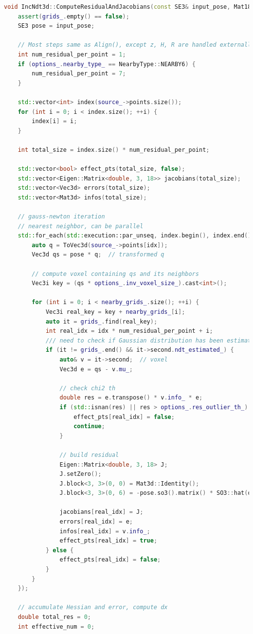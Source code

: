 \begin{lstlisting}[language=c++,caption=src/ch7/ndt\_inc.cc]
void IncNdt3d::ComputeResidualAndJacobians(const SE3& input_pose, Mat18d& HTVH, Vec18d& HTVr) {
	assert(grids_.empty() == false);
	SE3 pose = input_pose;
	
	// Most steps same as Align(), except z, H, R are handled externally
	int num_residual_per_point = 1;
	if (options_.nearby_type_ == NearbyType::NEARBY6) {
		num_residual_per_point = 7;
	}
	
	std::vector<int> index(source_->points.size());
	for (int i = 0; i < index.size(); ++i) {
		index[i] = i;
	}
	
	int total_size = index.size() * num_residual_per_point;
	
	std::vector<bool> effect_pts(total_size, false);
	std::vector<Eigen::Matrix<double, 3, 18>> jacobians(total_size);
	std::vector<Vec3d> errors(total_size);
	std::vector<Mat3d> infos(total_size);
	
	// gauss-newton iteration
	// nearest neighbor, can be parallel
	std::for_each(std::execution::par_unseq, index.begin(), index.end(), [&](int idx) {
		auto q = ToVec3d(source_->points[idx]);
		Vec3d qs = pose * q;  // transformed q
		
		// compute voxel containing qs and its neighbors
		Vec3i key = (qs * options_.inv_voxel_size_).cast<int>();
		
		for (int i = 0; i < nearby_grids_.size(); ++i) {
			Vec3i real_key = key + nearby_grids_[i];
			auto it = grids_.find(real_key);
			int real_idx = idx * num_residual_per_point + i;
			/// need to check if Gaussian distribution has been estimated
			if (it != grids_.end() && it->second.ndt_estimated_) {
				auto& v = it->second;  // voxel
				Vec3d e = qs - v.mu_;
				
				// check chi2 th
				double res = e.transpose() * v.info_ * e;
				if (std::isnan(res) || res > options_.res_outlier_th_) {
					effect_pts[real_idx] = false;
					continue;
				}
				
				// build residual
				Eigen::Matrix<double, 3, 18> J;
				J.setZero();
				J.block<3, 3>(0, 0) = Mat3d::Identity();                   // Jacobian w.r.t. p
				J.block<3, 3>(0, 6) = -pose.so3().matrix() * SO3::hat(q);  // Jacobian w.r.t. R
				
				jacobians[real_idx] = J;
				errors[real_idx] = e;
				infos[real_idx] = v.info_;
				effect_pts[real_idx] = true;
			} else {
				effect_pts[real_idx] = false;
			}
		}
	});
	
	// accumulate Hessian and error, compute dx
	double total_res = 0;
	int effective_num = 0;
	

\end{lstlisting}
